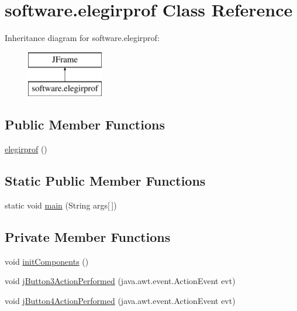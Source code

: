 \hypertarget{classsoftware_1_1elegirprof}{}\section{software.\+elegirprof Class Reference}
\label{classsoftware_1_1elegirprof}
Inheritance diagram for software.\+elegirprof\+:\begin{figure}[H]
\begin{center}
\leavevmode
\includegraphics[height=2.000000cm]{classsoftware_1_1elegirprof}
\end{center}
\end{figure}
\subsection*{Public Member Functions}
\begin{DoxyCompactItemize}
\item 
\mbox{\hyperlink{classsoftware_1_1elegirprof_aa313615b4f8abecfacd11e7a5a8c41f6}{elegirprof}} ()
\end{DoxyCompactItemize}
\subsection*{Static Public Member Functions}
\begin{DoxyCompactItemize}
\item 
static void \mbox{\hyperlink{classsoftware_1_1elegirprof_a416eea3c7c1afd90202409d2fd720735}{main}} (String args\mbox{[}$\,$\mbox{]})
\end{DoxyCompactItemize}
\subsection*{Private Member Functions}
\begin{DoxyCompactItemize}
\item 
void \mbox{\hyperlink{classsoftware_1_1elegirprof_abc5a84bcdb0181a59f2f9d129cb2829f}{init\+Components}} ()
\item 
void \mbox{\hyperlink{classsoftware_1_1elegirprof_a4e181a30f97bb3098d2c1c9ef3fb26a4}{j\+Button3\+Action\+Performed}} (java.\+awt.\+event.\+Action\+Event evt)
\item 
void \mbox{\hyperlink{classsoftware_1_1elegirprof_a321037ccc1de9fd2bebbfe84eed2d536}{j\+Button4\+Action\+Performed}} (java.\+awt.\+event.\+Action\+Event evt)
\end{DoxyCompactItemize}
